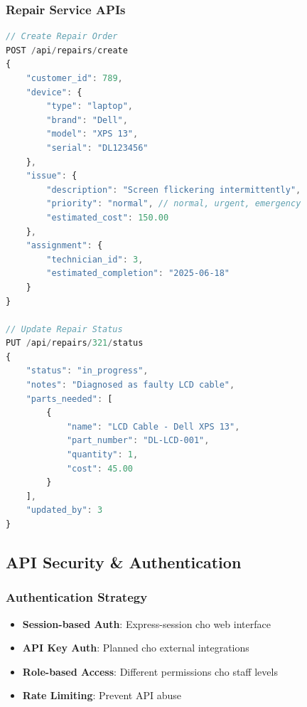 \documentclass[12pt,a4paper]{article}
\begin{document}
\subsubsection{Repair Service APIs}
\begin{lstlisting}[language=javascript, caption=Repair Service API]
// Create Repair Order
POST /api/repairs/create
{
    "customer_id": 789,
    "device": {
        "type": "laptop",
        "brand": "Dell",
        "model": "XPS 13",
        "serial": "DL123456"
    },
    "issue": {
        "description": "Screen flickering intermittently",
        "priority": "normal", // normal, urgent, emergency
        "estimated_cost": 150.00
    },
    "assignment": {
        "technician_id": 3,
        "estimated_completion": "2025-06-18"
    }
}

// Update Repair Status
PUT /api/repairs/321/status  
{
    "status": "in_progress",
    "notes": "Diagnosed as faulty LCD cable",
    "parts_needed": [
        {
            "name": "LCD Cable - Dell XPS 13",
            "part_number": "DL-LCD-001",
            "quantity": 1,
            "cost": 45.00
        }
    ],
    "updated_by": 3
}
\end{lstlisting}

\subsection{API Security \& Authentication}
\subsubsection{Authentication Strategy}
\begin{itemize}
    \item \textbf{Session-based Auth}: Express-session cho web interface
    \item \textbf{API Key Auth}: Planned cho external integrations  
    \item \textbf{Role-based Access}: Different permissions cho staff levels
    \item \textbf{Rate Limiting}: Prevent API abuse
\end{itemize}
\end{document}
